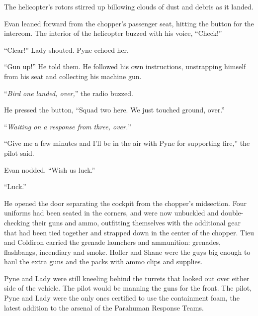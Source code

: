 








The helicopter's rotors stirred up billowing clouds of dust and debris as it landed.



Evan leaned forward from the chopper's passenger seat, hitting the button for the intercom.  The interior of the helicopter buzzed with his voice, ``Check!''



``Clear!''  Lady shouted.  Pyne echoed her.



``Gun up!''  He told them.  He followed his own instructions, unstrapping himself from his seat and collecting his machine gun.



``\emph{Bird one landed, over,}'' the radio buzzed.



He pressed the button, ``Squad two here.  We just touched ground, over.''



``\emph{Waiting on a response from three, over.}''



``Give me a few minutes and I'll be in the air with Pyne for supporting fire,'' the pilot said.



Evan nodded.  ``Wish us luck.''



``Luck.''



He opened the door separating the cockpit from the chopper's midsection.  Four uniforms had been seated in the corners, and were now unbuckled and double-checking their guns and ammo, outfitting themselves with the additional gear that had been tied together and strapped down in the center of the chopper.  Tieu and Coldiron carried the grenade launchers and ammunition: grenades, flashbangs, incendiary and smoke.  Holler and Shane were the guys big enough to haul the extra guns and the packs with ammo clips and supplies.



Pyne and Lady were still kneeling behind the turrets that looked out over either side of the vehicle.  The pilot would be manning the guns for the front.  The pilot, Pyne and Lady were the only ones certified to use the containment foam, the latest addition to the arsenal of the Parahuman Response Teams.



